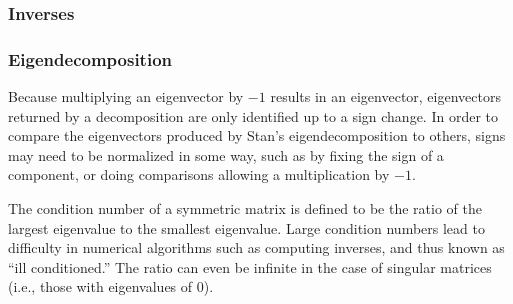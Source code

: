 \begin{description}
%
%
\end{description}

\subsubsection{Inverses}

\begin{description}
%
%
%
\end{description}

\subsubsection{Eigendecomposition}

\begin{description}
%
%
%
\end{description}
%
Because multiplying an eigenvector by $-1$ results in an eigenvector,
eigenvectors returned by a decomposition are only identified up to a
sign change.  In order to compare the eigenvectors produced by Stan's
eigendecomposition to others, signs may need to be normalized in some
way, such as by fixing the sign of a component, or doing comparisons
allowing a multiplication by $-1$.

The condition number of a symmetric matrix is defined to be the ratio
of the largest eigenvalue to the smallest eigenvalue.  Large condition
numbers lead to difficulty in numerical algorithms such as computing
inverses, and thus known as ``ill conditioned.''  The ratio can even
be infinite in the case of singular matrices (i.e., those with
eigenvalues of 0).

%
%
%

